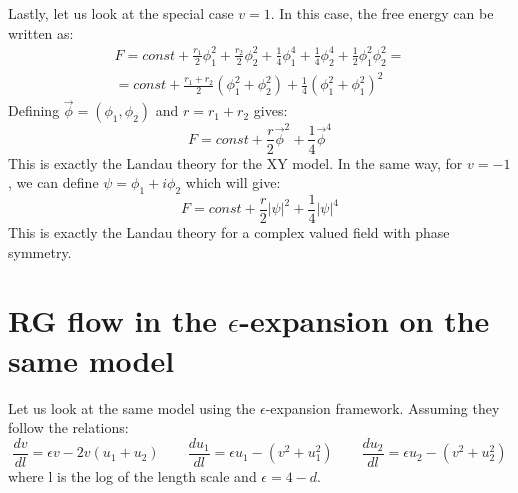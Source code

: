 \documentclass{article}
\begin{document}
\newline
Lastly, let us look at the special case $v = 1$. In this case, the free energy can be written as:
\begin{equation}
\begin{gathered}
    F = const +
    \frac{r_1}{2}\phi_1^2 +
    \frac{r_2}{2}\phi_2^2 +
    \frac{1}{4}\phi_1^4 +
    \frac{1}{4}\phi_2^4 +
    \frac{1}{2}\phi_1^2\phi_2^2 = \\ =
    const +
    \frac{r_1 + r_2}{2}(\phi_1^2 + \phi_2^2) +
    \frac{1}{4}(\phi_1^2 + \phi_1^2)^2
\end{gathered}
\end{equation}
Defining $\vec{\phi} = (\phi_1, \phi_2)$ and $r = r_1 + r_2$ gives:
\begin{equation}
    F = const + \frac{r}{2}\vec{\phi}^2 + \frac{1}{4}\vec{\phi}^4
\end{equation}
This is exactly the Landau theory for the XY model. In the same way, for $v = -1$, we can define $\psi = \phi_1 + i \phi_2$ which will give:
\begin{equation}
    F = const + \frac{r}{2}|\psi|^2 + \frac{1}{4}|\psi|^4
\end{equation} 
This is exactly the Landau theory for a complex valued field with phase symmetry.
\section{RG flow in the $\epsilon$-expansion on the same model}
Let us look at the same model using the $\epsilon$-expansion framework. Assuming they follow the relations:
\begin{equation}
    \frac{dv}{dl} = \epsilon v - 2v(u_1 + u_2)
    \qquad
    \frac{du_1}{dl} = \epsilon u_1 - (v^2 + u_1^2)
    \qquad
    \frac{du_2}{dl} = \epsilon u_2 - (v^2 + u_2^2)
\end{equation}
where l is the log of the length scale and $\epsilon = 4 - d$.
\end{document}
